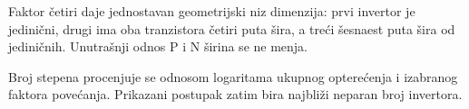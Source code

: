 Faktor četiri daje jednostavan geometrijski niz dimenzija: prvi invertor je jedinični, drugi ima oba tranzistora četiri puta šira, a treći šesnaest puta šira od jediničnih. Unutrašnji odnos P i N širina se ne menja.

Broj stepena procenjuje se odnosom logaritama ukupnog opterećenja i izabranog faktora povećanja. Prikazani postupak zatim bira najbliži neparan broj invertora.
